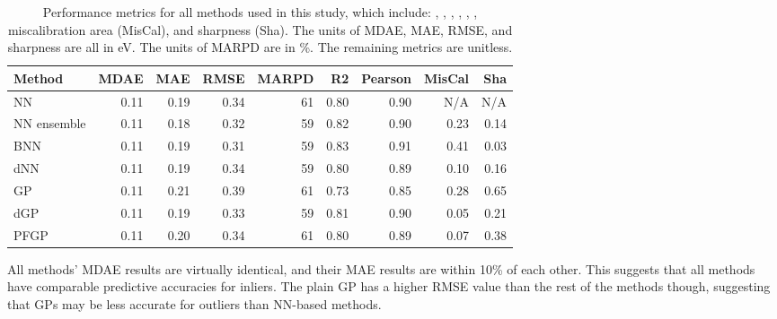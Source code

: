 \documentclass[]{achemso}
\begin{document}
\begin{table}
    \centering
    \begin{tabular}{lrrrrrrrr}
        \toprule
        Method              & \gls{MDAE}    & \gls{MAE} & \gls{RMSE}    & \gls{MARPD}   & \gls{R2}  & \gls{Pearson} & MisCal    & Sha \\
        \midrule
        \gls{NN}            & 0.11          & 0.19      & 0.34          & 61            & 0.80      & 0.90          & N/A       & N/A \\
        \gls{NN} ensemble   & 0.11          & 0.18      & 0.32          & 59            & 0.82      & 0.90          & 0.23      & 0.14 \\
        \gls{BNN}           & 0.11          & 0.19      & 0.31          & 59            & 0.83      & 0.91          & 0.41      & 0.03 \\
        \gls{dNN}           & 0.11          & 0.19      & 0.34          & 59            & 0.80      & 0.89          & 0.10      & 0.16 \\
        \gls{GP}            & 0.11          & 0.21      & 0.39          & 61            & 0.73      & 0.85          & 0.28      & 0.65 \\
        \gls{dGP}           & 0.11          & 0.19      & 0.33          & 59            & 0.81      & 0.90          & 0.05      & 0.21 \\
        \gls{PFGP}          & 0.11          & 0.20      & 0.34          & 61            & 0.80      & 0.89          & 0.07      & 0.38 \\
        \bottomrule
    \end{tabular}
    \caption{Performance metrics for all methods used in this study, which include:
    , , , ,
    , ,
    miscalibration area (MisCal), and sharpness (Sha).
    The units of \gls{MDAE}, \gls{MAE}, \gls{RMSE}, and sharpness are all in \gls{eV}.
    The units of \gls{MARPD} are in \%.
    The remaining metrics are unitless.}\label{tab:results}
\end{table}

All methods' \gls{MDAE} results are virtually identical, and their \gls{MAE} results are within 10\% of each other.
This suggests that all methods have comparable predictive accuracies for inliers.
The plain \gls{GP} has a higher \gls{RMSE} value than the rest of the methods though, suggesting that \gls{GP}s may be less accurate for outliers than \gls{NN}-based methods.
\end{document}
